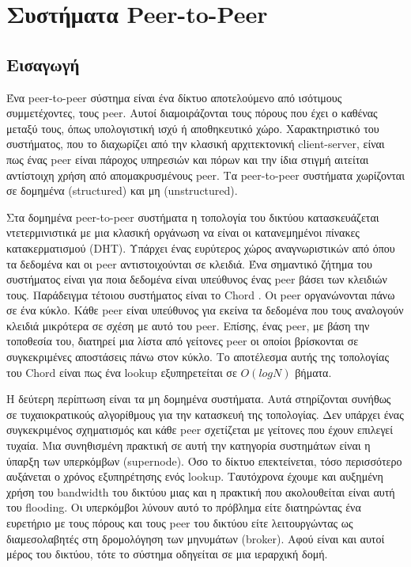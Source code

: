 \chapter{Συστήματα Peer-to-Peer}
\label{chap:P2P}

\section{Εισαγωγή}

Ένα peer-to-peer σύστημα είναι ένα δίκτυο αποτελούμενο από ισότιμους 
συμμετέχοντες, τους peer. Αυτοί διαμοιράζονται τους πόρους που έχει ο 
καθένας μεταξύ τους, όπως υπολογιστική ισχύ ή αποθηκευτικό χώρο. 
Χαρακτηριστικό του συστήματος, που το διαχωρίζει από την κλασική 
αρχιτεκτονική client-server, είναι πως ένας peer είναι πάροχος υπηρεσιών 
και πόρων και την ίδια στιγμή αιτείται αντίστοιχη χρήση από 
απομακρυσμένους peer. Τα peer-to-peer συστήματα χωρίζονται σε δομημένα 
(structured) και μη (unstructured). 

Στα δομημένα peer-to-peer συστήματα η τοπολογία του δικτύου 
κατασκευάζεται ντετερμινιστικά με μια κλασική οργάνωση να είναι οι 
κατανεμημένοι πίνακες κατακερματισμού (DHT). Υπάρχει ένας ευρύτερος 
χώρος αναγνωριστικών από όπου τα δεδομένα και οι peer αντιστοιχούνται σε 
κλειδιά. Ένα σημαντικό ζήτημα του συστήματος είναι για ποια δεδομένα 
είναι υπεύθυνος ένας peer βάσει των κλειδιών τους. Παράδειγμα τέτοιου 
συστήματος είναι το Chord \citep{Tanenbaum2006}. Οι peer οργανώνονται 
πάνω σε ένα κύκλο. Κάθε peer είναι υπεύθυνος για εκείνα τα δεδομένα που 
τους αναλογούν κλειδιά μικρότερα σε σχέση με αυτό του peer. Επίσης, ένας 
peer, με βάση την τοποθεσία του, διατηρεί μια λίστα από γείτονες peer οι 
οποίοι βρίσκονται σε συγκεκριμένες αποστάσεις πάνω στον κύκλο. Το 
αποτέλεσμα αυτής της τοπολογίας του Chord είναι πως ένα lookup 
εξυπηρετείται σε $O(logN)$ βήματα.

Η δεύτερη περίπτωση είναι τα μη δομημένα συστήματα. Αυτά στηρίζονται 
συνήθως σε τυχαιοκρατικούς αλγορίθμους για την κατασκευή της τοπολογίας. 
Δεν υπάρχει ένας συγκεκριμένος σχηματισμός και κάθε peer σχετίζεται με 
γείτονες που έχουν επιλεγεί τυχαία. Μια συνηθισμένη πρακτική σε αυτή την 
κατηγορία συστημάτων είναι η ύπαρξη των υπερκόμβων (supernode). Όσο το 
δίκτυο επεκτείνεται, τόσο περισσότερο αυξάνεται ο χρόνος εξυπηρέτησης 
ενός lookup. Ταυτόχρονα έχουμε και αυξημένη χρήση του bandwidth του 
δικτύου μιας και η πρακτική που ακολουθείται είναι αυτή του flooding. Οι 
υπερκόμβοι λύνουν αυτό το πρόβλημα είτε διατηρώντας ένα ευρετήριο με 
τους πόρους και τους peer του δικτύου είτε λειτουργώντας ως 
διαμεσολαβητές στη δρομολόγηση των μηνυμάτων (broker). Αφού είναι και 
αυτοί μέρος του δικτύου, τότε το σύστημα οδηγείται σε μια ιεραρχική 
δομή.

